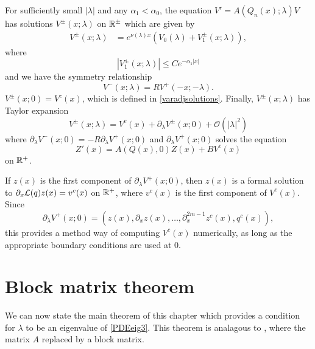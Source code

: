 \documentclass[thesis.tex]{subfiles}
\begin{document}
\begin{lemma}\label{lemma:Vpm}
For sufficiently small $|\lambda|$ and any $\alpha_1 < \alpha_0$, the equation $V' = A(Q_n(x); \lambda)V$ has solutions $V^\pm(x; \lambda)$ on $\mathbb{R}^\pm$ which are given by
\begin{align}\label{Vpmlambda}
V^\pm(x; \lambda) &= e^{\nu(\lambda)x}(V_0(\lambda) + V_1^\pm(x; \lambda)),
\end{align}
where
\begin{equation}\label{Vpmdecay}
|V_1^\pm(x; \lambda)| \leq C e^{-\alpha_1 |x|}
\end{equation}
and we have the symmetry relationship
\begin{equation}\label{Vpmsymmetry}
V^-(x; \lambda) = R V^+(-x; -\lambda).
\end{equation}
$V^\pm(x; 0) = V^c(x)$, which is defined in \cref{varadjsolutions}. Finally, $V^\pm(x; \lambda)$ has Taylor expansion
\begin{equation}
V^\pm(x; \lambda) = V^c(x) + \partial_\lambda V^\pm(x; 0) + \mathcal{O}(|\lambda|^2)
\end{equation}
where $\partial_\lambda V^-(x; 0) = -R \partial_\lambda V^+(x; 0)$ and $\partial_\lambda V^+(x; 0)$ solves the equation
\[
Z'(x) = A(Q(x),0) Z(x) + B V^c(x)
\]
on $\mathbb{R}^+$.
\end{lemma}

\begin{remark}\label{remark:computeVc}
If $z(x)$ is the first component of $\partial_\lambda V^+(x; 0)$, then $z(x)$ is a formal solution to $\partial_x \mathcal{L}(q) z(x) = v^c(x)$ on $\mathbb{R}^+$, where $v^c(x)$ is the first component of $V^c(x)$. Since
\[
\partial_\lambda V^+(x; 0) = (z(x), \partial_x z(x), \dots, \partial_x^{2m-1}z^c(x), q^c(x) ),
\]
this provides a method way of computing $V^c(x)$ numerically, as long as the appropriate boundary conditions are used at 0.
\end{remark}

\section{Block matrix theorem}

We can now state the main theorem of this chapter which provides a condition for $\lambda$ to be an eigenvalue of \eqref{PDEeig3}. This theorem is analagous to \cite[Theorem 2]{Sandstede1998}, where the matrix $A$ replaced by a block matrix.
\end{document}
